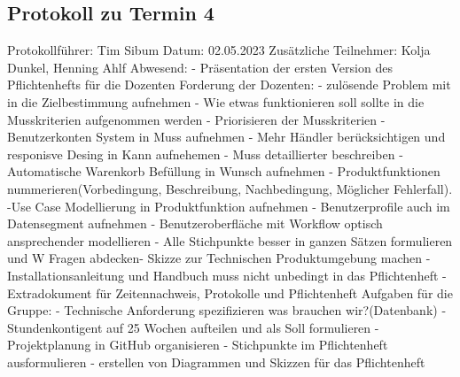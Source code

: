\subsection{Protokoll zu Termin 4}
Protokollführer: Tim Sibum \newline
Datum: 02.05.2023 \newline
Zusätzliche Teilnehmer: Kolja Dunkel, Henning Ahlf \newline
Abwesend: - \newline \newline
Präsentation der ersten Version des Pflichtenhefts für die Dozenten \newline\newline
Forderung der Dozenten:\newline
  - zulösende Problem mit in die Zielbestimmung aufnehmen\newline
  - Wie etwas funktionieren soll sollte in die Musskriterien aufgenommen werden
  \newline 
  - Priorisieren der Musskriterien\newline
  - Benutzerkonten System in Muss aufnehmen\newline
  - Mehr Händler berücksichtigen und responisve Desing in Kann aufnehemen\newline
  - Muss detaillierter beschreiben\newline
  - Automatische Warenkorb Befüllung in Wunsch aufnehmen\newline
  - Produktfunktionen nummerieren(Vorbedingung, Beschreibung\newline, 
  Nachbedingung, Möglicher Fehlerfall).\newline
  -Use Case Modellierung in Produktfunktion aufnehmen\newline
  - Benutzerprofile auch im Datensegment aufnehmen\newline
  - Benutzeroberfläche mit Workflow optisch ansprechender modellieren\newline
  - Alle Stichpunkte besser in ganzen Sätzen formulieren und W Fragen abdecken\newline 	  - Skizze zur Technischen Produktumgebung machen\newline
  - Installationsanleitung und Handbuch muss nicht unbedingt in das Pflichtenheft\newline 
  - Extradokument für Zeitennachweis, Protokolle und Pflichtenheft \newline 
Aufgaben für die Gruppe:\newline
  - Technische Anforderung spezifizieren was brauchen wir?(Datenbank)\newline        
  - Stundenkontigent auf 25 Wochen aufteilen und als Soll formulieren \newline
  - Projektplanung in GitHub organisieren\newline
  - Stichpunkte im Pflichtenheft ausformulieren \newline
  - erstellen von Diagrammen und Skizzen für das Pflichtenheft \newline

